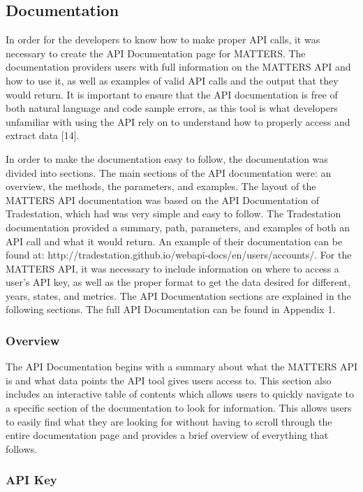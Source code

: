 		\subsection{Documentation}
			
			In order for the developers to know how to make proper API calls, it was necessary to create the API Documentation page for MATTERS. The documentation providers users with full information on the MATTERS API and how to use it, as well as examples of valid API calls and the output that they would return. It is important to ensure that the API documentation is free of both natural language and code sample errors, as this tool is what developers unfamiliar with using the API rely on to understand how to properly access and extract data [14]. 
			
			In order to make the documentation easy to follow, the documentation was divided into sections. The main sections of the API documentation were: an overview, the methods, the parameters, and examples. The layout of the MATTERS API documentation was based on the API Documentation of Tradestation, which had was very simple and easy to follow. The Tradestation documentation provided a summary, path, parameters, and examples of both an API call and what it would return. An example of their documentation can be found at: http://tradestation.github.io/webapi-docs/en/users/accounts/. For the MATTERS API, it was necessary to include information on where to access a user’s API key, as well as the proper format to get the data desired for different, years, states, and metrics. The API Documentation sections are explained in the following sections. The full API Documentation can be found in Appendix 1.
			
			
		\subsubsection{Overview}
			
		The API Documentation begins with a summary about what the MATTERS API is and what data points the API tool gives users access to. This section also includes an interactive table of contents which allows users to quickly navigate to a specific section of the documentation to look for information. This allows users to easily find what they are looking for without having to scroll through the entire documentation page and provides a brief overview of everything that follows.
			
			\subsubsection{API Key}
			

